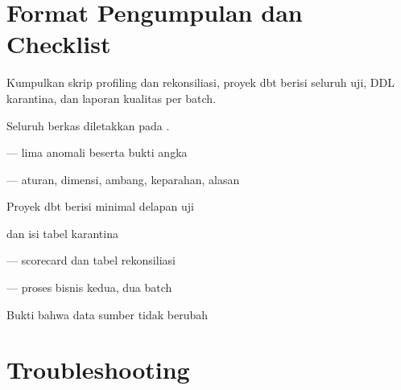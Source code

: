 \section{Format Pengumpulan dan Checklist}

Kumpulkan skrip profiling dan rekonsiliasi, proyek dbt berisi seluruh uji, DDL
karantina, dan laporan kualitas per batch.

Seluruh berkas diletakkan pada .

\begin{ceklis}
  \item {}
  \item {} --- lima anomali beserta bukti angka
  \item {} --- aturan, dimensi, ambang, keparahan,
        alasan
  \item Proyek dbt berisi minimal delapan uji
  \item {} dan isi tabel karantina
  \item {} --- scorecard dan tabel rekonsiliasi
  \item {} --- proses bisnis kedua, dua batch
  \item {}
  \item Bukti bahwa data sumber tidak berubah
\end{ceklis}

\section{Troubleshooting}


